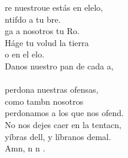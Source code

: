 \begin{cancion}%
	re nuestroue estás en elelo,\\
	ntifdo a tu bre.\\
	ga a nosotros tu Ro.\\
	Háge tu volud la tierra \\
	o en el elo.\\
	Danos  nuestro pan de cada a, \\
	\jump\\
perdona nuestras ofensas, \\
	como tambn nosotros\\
	perdonamos a los que nos ofend.\\
	No nos dejes caer en la tentacn,\\
	yíbras dell, y líbranos demal.\\
	Amn, n n .  \\
\end{cancion}%
